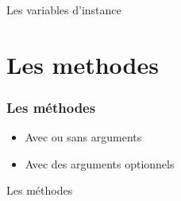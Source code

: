 \documentclass{beamer}
\begin{document}
\begin{frame}
  \begin{beamerboxesrounded}{Les variables d'instance}
    
  \end{beamerboxesrounded}
\end{frame}


\section{Les methodes}

\begin{frame}
  \frametitle{Les m\'ethodes}
  \begin{itemize}
    \item Avec ou sans arguments
    \item Avec des arguments optionnels
  \end{itemize}
\end{frame}

\begin{frame}
  \begin{beamerboxesrounded}{Les m\'ethodes}
    
  \end{beamerboxesrounded}
\end{frame}
\end{document}
